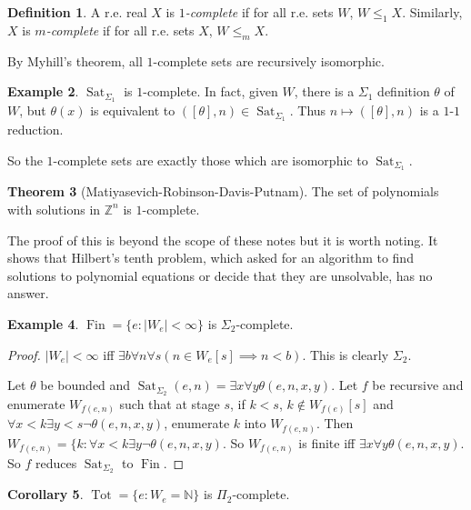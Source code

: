 \documentclass[12pt]{report}
\newcommand{\NN}{\mathbb{N}}
\newcommand{\ZZ}{\mathbb{Z}}
\DeclareMathOperator{\Fin}{Fin}
\DeclareMathOperator{\Sat}{Sat}
\DeclareMathOperator{\Tot}{Tot}
\newcommand{\dfn}[1]{\emph{#1}\index{#1}}
\theoremstyle{definition}
\newtheorem{theorem}{Theorem}[chapter]
\newtheorem{corollary}[theorem]{Corollary}
\newtheorem{definition}[theorem]{Definition}
\newtheorem{example}[theorem]{Example}
\begin{document}
\begin{definition}
A r.e. real $X$ is \dfn{$1$-complete} if for all r.e. sets $W$, $W \leq_1 X$. Similarly, $X$ is \dfn{$m$-complete} if for all r.e. sets $X$, $W \leq_m X$.
\end{definition}
By Myhill's theorem, all $1$-complete sets are recursively isomorphic.

\begin{example}
$\Sat_{\Sigma_1}$ is $1$-complete. In fact, given $W$, there is a $\Sigma_1$ definition $\theta$ of $W$, but $\theta(x)$ is equivalent to $([\theta], n) \in \Sat_{\Sigma_1}$. Thus $n \mapsto ([\theta], n)$ is a $1$-$1$ reduction.
\end{example}
So the $1$-complete sets are exactly those which are isomorphic to $\Sat_{\Sigma_1}$.

\begin{theorem}[Matiyasevich-Robinson-Davis-Putnam]
The set of polynomials with solutions in $\ZZ^n$ is $1$-complete.
\end{theorem}
The proof of this is beyond the scope of these notes but it is worth noting. It shows that Hilbert's tenth problem, which asked for an algorithm to find solutions to polynomial equations or decide that they are unsolvable, has no answer.

\begin{example}
$\Fin = \{e: |W_e| < \infty\}$ is $\Sigma_2$-complete.
\end{example}
\begin{proof}
$|W_e| < \infty$ iff $\exists b\forall n\forall s(n \in W_e[s]\implies n < b)$. This is clearly $\Sigma_2$.

Let $\theta$ be bounded and $\Sat_{\Sigma_2}(e, n) = \exists x\forall y\theta(e, n, x, y)$. Let $f$ be recursive and enumerate $W_{f(e, n)}$ such that at stage $s$, if $k < s$, $k \notin W_{f(e)}[s]$ and $\forall x < k\exists y < s \neg\theta(e, n, x, y)$, enumerate $k$ into $W_{f(e, n)}$.
Then $W_{f(e, n)} = \{k: \forall x < k \exists y\neg \theta(e, n, x, y)$. So $W_{f(e, n)}$ is finite iff $\exists x\forall y\theta(e, n, x, y)$. So $f$ reduces $\Sat_{\Sigma_2}$ to $\Fin$.
\end{proof}
\begin{corollary}
$\Tot = \{e: W_e = \NN\}$ is $\Pi_2$-complete.
\end{corollary}
\end{document}
